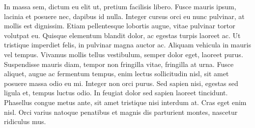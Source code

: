 \documentclass{novel}
\begin{document}
In massa sem, dictum eu elit ut, pretium facilisis libero. Fusce mauris ipsum, lacinia et posuere nec, dapibus id nulla. Integer cursus orci eu nunc pulvinar, at mollis est dignissim. Etiam pellentesque lobortis augue, vitae pulvinar tortor volutpat eu. Quisque elementum blandit dolor, ac egestas turpis laoreet ac. Ut tristique imperdiet felis, in pulvinar magna auctor ac. Aliquam vehicula in mauris vel tempus. Vivamus mollis tellus vestibulum, semper dolor eget, laoreet purus. Suspendisse mauris diam, tempor non fringilla vitae, fringilla at urna. Fusce aliquet, augue ac fermentum tempus, enim lectus sollicitudin nisl, sit amet posuere massa odio eu mi. Integer non orci purus. Sed sapien nisi, egestas sed ligula et, tempus luctus odio. In feugiat dolor sed sapien laoreet tincidunt. Phasellus congue metus ante, sit amet tristique nisi interdum at. Cras eget enim nisl. Orci varius natoque penatibus et magnis dis parturient montes, nascetur ridiculus mus.
\end{document}
